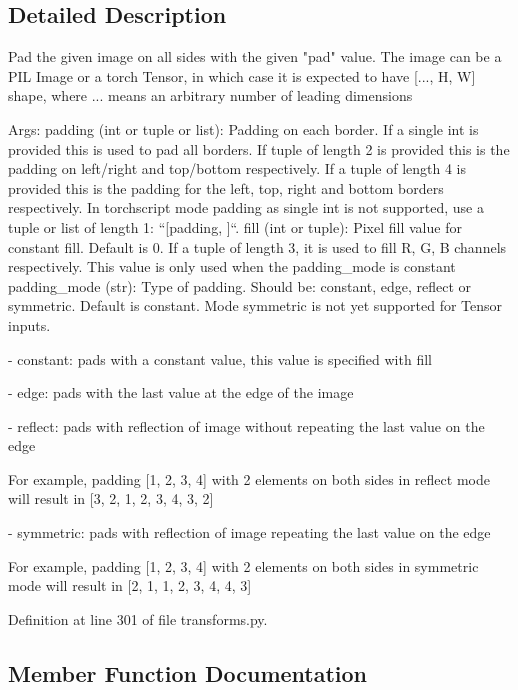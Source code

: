 \subsection{Detailed Description}
\begin{DoxyVerb}Pad the given image on all sides with the given "pad" value.
The image can be a PIL Image or a torch Tensor, in which case it is expected
to have [..., H, W] shape, where ... means an arbitrary number of leading dimensions

Args:
    padding (int or tuple or list): Padding on each border. If a single int is provided this
        is used to pad all borders. If tuple of length 2 is provided this is the padding
        on left/right and top/bottom respectively. If a tuple of length 4 is provided
        this is the padding for the left, top, right and bottom borders respectively.
        In torchscript mode padding as single int is not supported, use a tuple or
        list of length 1: ``[padding, ]``.
    fill (int or tuple): Pixel fill value for constant fill. Default is 0. If a tuple of
        length 3, it is used to fill R, G, B channels respectively.
        This value is only used when the padding_mode is constant
    padding_mode (str): Type of padding. Should be: constant, edge, reflect or symmetric.
        Default is constant. Mode symmetric is not yet supported for Tensor inputs.

        - constant: pads with a constant value, this value is specified with fill

        - edge: pads with the last value at the edge of the image

        - reflect: pads with reflection of image without repeating the last value on the edge

            For example, padding [1, 2, 3, 4] with 2 elements on both sides in reflect mode
            will result in [3, 2, 1, 2, 3, 4, 3, 2]

        - symmetric: pads with reflection of image repeating the last value on the edge

            For example, padding [1, 2, 3, 4] with 2 elements on both sides in symmetric mode
            will result in [2, 1, 1, 2, 3, 4, 4, 3]
\end{DoxyVerb}
 

Definition at line 301 of file transforms.\+py.



\subsection{Member Function Documentation}
\mbox{\label{classtorchvision_1_1transforms_1_1transforms_1_1Pad_a4155192980ce1513c877c31f84482832}} 
